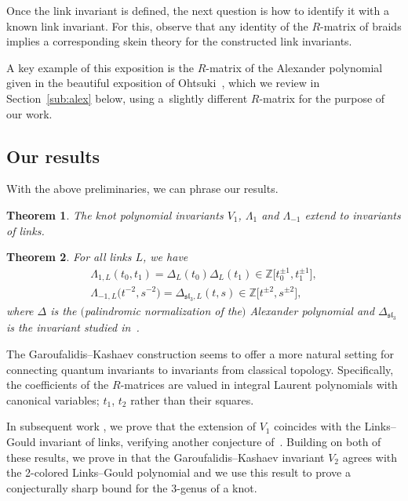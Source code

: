 \documentclass[10pt,a4paper]{amsart}
\numberwithin{equation}{section}
\newtheorem{Theorem}{Theorem}[section]
\theoremstyle{definition}
\begin{document}
Once the link invariant is defined, the next question is how to identify it
with a known link invariant. For this, observe that any identity of the $R$-matrix
of braids implies a corresponding skein theory for the constructed link invariants.

A key example of this exposition is the $R$-matrix of the Alexander polynomial
given in the beautiful exposition of Ohtsuki~\cite[Proposition~2.6]{Ohtsuki}, which we
review in Section~\ref{sub:alex} below, using a~slightly different $R$-matrix for
the purpose of our work.

\subsection{Our results}
\label{sub:results}

With the above preliminaries, we can phrase our results.


\begin{Theorem}\label{thm.1}
The knot polynomial invariants $V_1$, $\Lambda_1$ and $\Lambda_{-1}$ extend
to invariants of links.
\end{Theorem}

\begin{Theorem}\label{thm.2}
For all links $L$, we have
\begin{gather}%
\Lambda_{1,L}(t_0, t_1) = \Delta_L (t_0) \Delta_L(t_1)
\in \mathbb{Z}\bigl[t_0^{\pm 1},t_1^{\pm 1}\bigr],
\nonumber\\
\label{Lam1}
\Lambda_{-1,L}\bigl(t^{-2}, s^{-2}\bigr) = \Delta_{\mathfrak{sl}_3,L}(t,s)
\in \mathbb{Z}\bigl[t^{\pm2},s^{\pm2}\bigr],
\end{gather}
where $\Delta$ is the $($palindromic normalization of the$)$ Alexander polynomial and
$\Delta_{\mathfrak{sl}_3}$ is the invariant studied in~{\rm \cite{Harper}}.
\end{Theorem}


The Garoufalidis--Kashaev construction seems to offer a more natural setting for
connecting quantum invariants to invariants from classical topology. Specifically,
the coefficients of the $R$-matrices are valued in integral Laurent polynomials with
canonical variables; $t_1$, $t_2$ rather than their squares.

In subsequent work \cite{GHKKST}, we prove that the extension of $V_1$ coincides with the
Links--Gould invariant of links, verifying another conjecture of~\cite{GK:multi}. Building on both of these results, we prove in \cite{GHKKW} that the Garoufalidis--Kashaev invariant $V_2$ agrees with the 2-colored Links--Gould polynomial and we use this result to prove a conjecturally sharp bound for the 3-genus of a knot.
\end{document}
